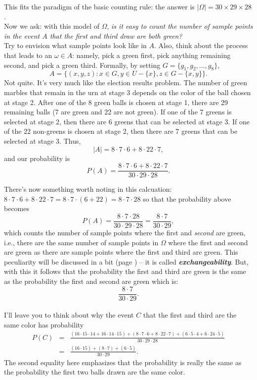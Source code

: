 \documentclass[12pt]{article}
\begin{document}
\noindent This fits the paradigm of the basic counting rule: the answer is $|\Omega|=30\times 29\times 28$.\\

\noindent Now we ask: with this model of $\Omega$, {\em is it easy to count the number of sample points in the event $A$ that the first and third draw are both green?}\\

\noindent Try to envision what sample points look like in $A$.  Also, think about the process that leads to an $\omega\in A$:
namely, pick a green first, pick anything remaining second, and pick a green third. Formally,
by setting $G=\{g_1,g_2,\dots,g_8\}$,
$$A = \Big\{(x,y,z):x\in G, y\in U-\{x\},z\in G-\{x,y\}\Big\}.$$
  Not quite.  It's very much like the election results problem. The number of green marbles that remain in the urn at stage 3 depends on the color of the ball chosen at stage 2.  After one of the 8 green balls is chosen at stage 1, there are 29 remaining balls (7 are green and 22 are not green).  If one of the 7 greens is selected at stage 2, then there are 6 greens that can be selected at stage 3.  If one of the 22 non-greens is chosen at stage 2, then there are 7 greens that can be selected at stage 3.  Thus,
$$|A| = 8\cdot 7\cdot 6 + 8\cdot 22\cdot 7,$$
and our probability is
$$P(A) = \frac {8\cdot 7\cdot 6 + 8\cdot 22\cdot 7}{30\cdot 29\cdot 28}.$$

\bigskip

\noindent There's now something worth noting in this calcuation: $8\cdot 7\cdot 6 + 8\cdot 22\cdot 7 = 8\cdot 7\cdot (6+22) = 8\cdot 7\cdot 28$ so that the probability above becomes
$$P(A) = \frac {8\cdot 7\cdot 28}{30\cdot 29\cdot 28} = \frac {8\cdot 7}{30\cdot 29},$$
which counts the number of sample points where the first and {\em second} are green, i.e., there are the same number of sample points in $\Omega$ where the
first and second are green as there are sample points where the first and third are green.
This peculiarity will be discussed in a bit (page \pageref{exchangeability2}) -- it is called {\bf\em exchangeability}\label{exchangeability1}. But, with this it follows that the probability the first and third are green is the same as the probability the first and second are green which is:
$$\frac {8\cdot 7}{30\cdot 29}.$$\\


\noindent I'll leave you to think about why the event $C$ that the first and third are the same color has probability
\begin{eqnarray*}
P(C) &=&
\frac {(16\cdot 15\cdot 14 + 16\cdot 14\cdot 15)+(8\cdot 7\cdot 6 + 8\cdot 22\cdot 7)+(6\cdot 5\cdot 4 + 6\cdot 24\cdot 5)}{30\cdot 29\cdot 28}\\
&=&
\frac {(16\cdot 15)+(8\cdot 7)+(6\cdot 5)}{30\cdot 29}.\end{eqnarray*}
The second equality here emphasizes that the probability is really the same as the probability the first two balls drawn are the same color.\\
\end{document}
